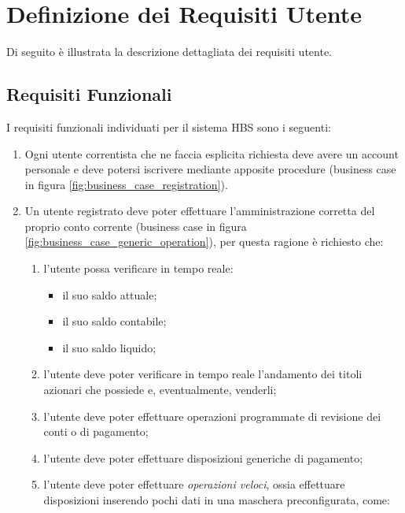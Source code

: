 
\section{Definizione dei Requisiti Utente}

Di seguito \`e illustrata la descrizione dettagliata dei requisiti utente.

\subsection{Requisiti Funzionali}
\label{sec:utente:funzionali}

I requisiti funzionali individuati per il sistema HBS sono i seguenti:

\begin{enumerate}
	\item \label{itm:utente:funzionali:iscrizione} Ogni utente correntista che ne faccia esplicita richiesta deve avere un account personale e deve potersi iscrivere  mediante apposite procedure (business case in figura \ref{fig:business_case_registration}).
	\item \label{itm:utente:funzionali:gestione-conto} Un utente registrato deve poter effettuare l'amministrazione corretta del proprio conto corrente (business case in figura \ref{fig:business_case_generic_operation}), per questa ragione è richiesto che:
	\begin{enumerate}
		\item \label{itm:utente:funzionali:gestione-conto:verifica-saldo} l'utente possa verificare in tempo reale:
			\begin{itemize}
				\item il suo saldo attuale;
				\item il suo saldo contabile;
				\item il suo saldo liquido;
			\end{itemize} 
		\item \label{itm:utente:funzionali:gestione-conto:verifica-andamento} l'utente deve poter verificare in tempo reale l'andamento dei titoli azionari che possiede e, eventualmente, venderli;
		\item \label{itm:utente:funzionali:gestione-conto:revisione} l'utente deve poter effettuare operazioni programmate di revisione dei conti o di pagamento;
		\item \label{itm:utente:funzionali:gestione-conto:operazioni} l'utente deve poter effettuare disposizioni generiche di pagamento;
		\item \label{itm:utente:funzionali:gestione-conto:operazioni-veloci} l'utente deve poter effettuare \emph{operazioni veloci}, ossia effettuare disposizioni inserendo pochi dati in una maschera preconfigurata, come:

\end{enumerate}
\end{enumerate}
